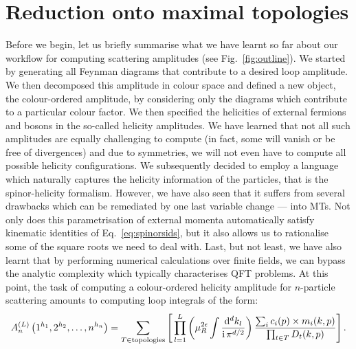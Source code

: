 \documentclass[main.tex]{subfiles}
\begin{document}
\section{Reduction onto maximal topologies} \label{sec:reduction}
Before we begin, let us briefly summarise what we have learnt so far about our workflow for computing scattering amplitudes (see Fig.~\ref{fig:outline}). We started by generating all Feynman diagrams that contribute to a desired loop amplitude. We then decomposed this amplitude in colour space and defined a new object, the colour-ordered amplitude, by considering only the diagrams which contribute to a particular colour factor. We then specified the helicities of external fermions and bosons in the so-called helicity amplitudes. We have learned that not all such amplitudes are equally challenging to compute (in fact, some will vanish or be free of divergences) and due to symmetries, we will not even have to compute all possible helicity configurations. We subsequently decided to employ a language which naturally captures the helicity information of the particles, that is the spinor-helicity formalism. However, we have also seen that it suffers from several drawbacks which can be remediated by one last variable change --- into MTs. Not only does this parametrisation of external momenta automatically satisfy kinematic identities of Eq.~\ref{eq:spinorsids}, but it also allows us to rationalise some of the square roots we need to deal with. Last, but not least, we have also learnt that by performing numerical calculations over finite fields, we can bypass the analytic complexity which typically characterises QFT problems.
At this point, the task of computing a colour-ordered helicity amplitude for $n$-particle scattering amounts to computing loop integrals of the form:
\begin{equation} \label{eq:ampschematic}
    	A_n^{(L)} \left(1^{h_1}, 2^{h_2}, \ldots, n^{h_n} \right) =  \sum_{T\in \text{topologies}} \left[\, \prod_{l=1}^{L} \left(\mu_R^{2\epsilon} \int \frac{\mathrm{d}^d k_l}{\mathrm{i} \, \pi^{d/2}}\right) \frac{\sum_i c_i(p)\times m_i(k,p)}{\prod_{t\in T} D_t(k,p)} \right].
\end{equation}
\end{document}
